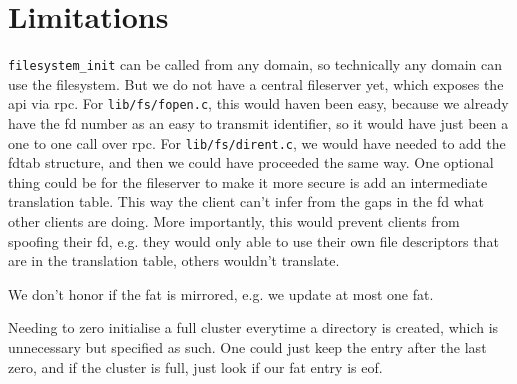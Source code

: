 % 

\section{Limitations}

\verb|filesystem_init| can be called from any domain, so technically any domain
can use the filesystem. But we do not have a central fileserver yet, which
exposes the api via rpc. For \verb|lib/fs/fopen.c|, this would haven been easy,
because we already have the fd number as an easy to transmit identifier, so it
would have just been a one to one call over rpc.
For \verb|lib/fs/dirent.c|, we would have needed to add the fdtab structure, and
then we could have proceeded the same way.
One optional thing could be for the fileserver to make it more secure is add an
intermediate translation table.
This way the client can't infer from the gaps in the fd what other clients are
doing.
More importantly, this would prevent clients from spoofing their fd, e.g. they
would only able to use their own file descriptors that are in the translation
table, others wouldn't translate.

We don't honor if the fat is mirrored, e.g. we update at most one fat.

Needing to zero initialise a full cluster everytime a directory is created,
which is unnecessary but specified as such.
One could just keep the entry after the last zero, and if the cluster is full,
just look if our fat entry is eof.

